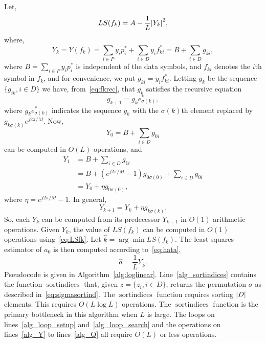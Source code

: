 \documentclass[journal]{IEEEtran}
\begin{document}
Let,
\begin{equation}\label{eq:LSfk}
LS(f_k) = A - \frac{1}{L}{\left\vert Y_k \right\vert}^2,
\end{equation}
where, 
\[
Y_k = Y( f_k ) = \sum_{i \in P} y_i p_i^*  + \sum_{i \in D} y_i f_{ki}^* = B + \sum_{i \in D}g_{ki},
\]
where $B = \sum_{i \in P} y_i p_i^*$ is independent of the data symbols, and $f_{ki}$ denotes the $i$th symbol in $f_k$, and for convenience, we put $g_{ki}  = y_i f_{ki}^*$.  Letting $g_{k}$ be the sequence $\{g_{ik}, i \in D\}$ we have, from~\eqref{eq:fkrec}, that $g_k$ satisfies the recursive equation
\[
g_{k+1} = g_{k} e_{\sigma(k)}^*,
\]
where $g_{k} e_{\sigma(k)}^*$ indicates the sequence $g_k$ with the $\sigma(k)$th element replaced by $g_{k \sigma(k)}e^{j2\pi/M}$.  Now,
\[
Y_0 = B + \sum_{i \in D} g_{0i}
\] 
can be computed in $O(L)$ operations, and
\begin{align*}
Y_1 &= B + \sum_{i \in D} g_{1i} \\
&= B +  (e^{j2\pi/M} - 1)g_{0\sigma(0)} + \sum_{i \in D} g_{0i} \\
&= Y_0 + \eta g_{0\sigma(0)},
\end{align*}
where $\eta = e^{j2\pi/M} - 1$.  In general,
\[
Y_{k+1} = Y_k + \eta g_{k\sigma(k)}.
\]
So, each $Y_k$ can be computed from its predecessor $Y_{k-1}$ in $O(1)$ arithmetic operations.  Given $Y_k$, the value of $LS(f_k)$ can be computed in $O(1)$ operations using~\eqref{eq:LSfk}.  Let $\hat{k} = \arg\min LS(f_k)$.  The least squares estimator of $a_0$ is then computed according to~\eqref{eq:hata},
\[
\hat{a} = \frac{1}{L} Y_{\hat{k}}.
\]
Pseudocode is given in Algorithm~\ref{alg:loglinear}.  Line~\ref{alg_sortindices} contains the function $\operatorname{sortindices}$ that, given $z = \{z_i, i \in D\}$, returns the permutation $\sigma$ as described in~\eqref{eq:sigmasortind}.  The $\operatorname{sortindices}$ function requires sorting ${\left\vert D \right\vert}$ elements.  This requires $O(L \log L)$ operations.  The $\operatorname{sortindices}$ function is the primary bottleneck in this algorithm when $L$ is large.  The loops on lines~\ref{alg_loop_setup} and~\ref{alg_loop_search} and the operations on lines~\ref{alg_Y} to lines~\ref{alg_Q} all require $O(L)$ or less operations.  %
\end{document}
